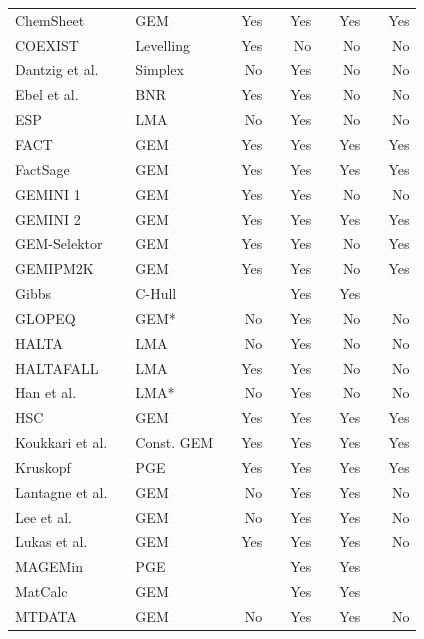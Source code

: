 {\begin{longtable}{@{}lclcrcrcrcr@{}}
		ChemSheet \cite{Koukkari:2005aa} && GEM && Yes && Yes && Yes && Yes\\
		COEXIST \cite{Ahafat:1992aa} && Levelling && Yes && No && No && No\\
		Dantzig et al. \cite{Dantzig:1958aa}&& Simplex && No && Yes && No && No\\
		Ebel et al. \cite{Ebel:2000aa} && BNR && Yes && Yes && No && No\\
		ESP \cite{Rafal:2003aa} && LMA && No && Yes && No && No\\
		FACT \cite{Thompson83} && GEM && Yes && Yes && Yes && Yes\\
		FactSage \cite{Bale83} && GEM && Yes && Yes && Yes && Yes\\
		GEMINI 1 \cite{Cheynet09} && GEM && Yes && Yes && No && No\\
		GEMINI 2 \cite{Cheynet09} && GEM && Yes && Yes && Yes && Yes\\
		GEM-Selektor \cite{Karpov:aa} && GEM && Yes && Yes && No && Yes\\
		GEMIPM2K \cite{Karpov:aa} && GEM && Yes && Yes && No && Yes\\
		Gibbs \cite{COOL2010393} && C-Hull && {} && Yes && Yes && {}\\
		GLOPEQ \cite{MCDONALD19971} && GEM* && No && Yes && No && No\\
		HALTA \cite{Sillen:1962aa} && LMA && No && Yes && No && No\\
		HALTAFALL \cite{INGRI19671261} && LMA && Yes && Yes && No && No\\
		Han et al. \cite{HAN1998897} && LMA* && No && Yes && No && No\\
		HSC \cite{HSCSoftware:aa} && GEM && Yes && Yes && Yes && Yes\\
		Koukkari et al. \cite{KOUKKARI200618} && Const. GEM && Yes && Yes && Yes && Yes\\
		Kruskopf \cite{Kruskopf:2018aa} && PGE && Yes && Yes && Yes && Yes\\
		Lantagne et al. \cite{LANTAGNE1988589} && {GEM} && No && Yes && Yes && No\\
		Lee et al. \cite{PENGLEE19991183} && {GEM} && No && Yes && Yes && No\\
		Lukas et al. \cite{Lukas77} && {GEM} && Yes && Yes && Yes && No\\
		MAGEMin \cite{Riel:2022aa} && {PGE} &&  && Yes && Yes && \\
		MatCalc \cite{Kozeschnik:2001aa} && {GEM} &&  && Yes && Yes && \\
		MTDATA  \cite{Davies02} && {GEM} && No && Yes && Yes && No\\

\end{longtable}}
